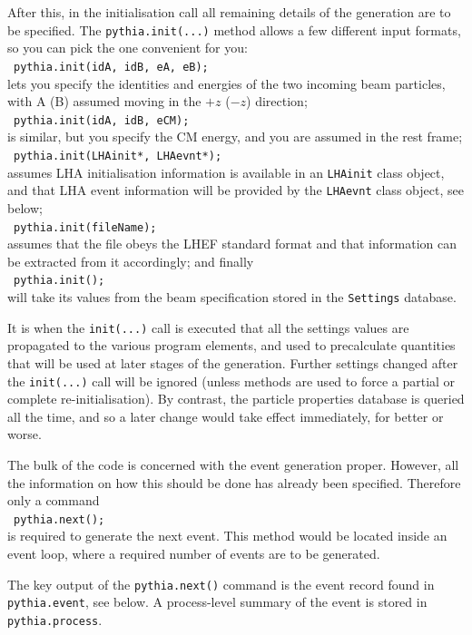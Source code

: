 \documentclass{elsartmod}
\newcommand{\cindent}{\hspace*{10mm}~}
\begin{document}
After this, in the initialisation call all remaining details of the 
generation are to be specified. The \texttt{pythia.init(...)} method 
allows a few different input formats, so you can pick the one 
convenient for you:\\
\cindent \texttt{pythia.init(idA, idB, eA, eB);}\\
lets you specify the identities and energies of the two incoming
beam particles, with A (B) assumed moving in the $+z$ ($-z$) 
direction;\\
\cindent \texttt{pythia.init(idA, idB, eCM);}\\
is similar, but you specify the CM energy, and you are assumed 
in the rest frame;\\
\cindent \texttt{pythia.init(LHAinit*, LHAevnt*);}\\ 
assumes LHA initialisation information is available 
in an \texttt{LHAinit} class object, and that LHA event information 
will be provided by the \texttt{LHAevnt} class object, see below;\\
\cindent \texttt{pythia.init(fileName);}\\ 
assumes that the file obeys the LHEF standard format and that 
information can be extracted from it accordingly;
and finally\\ 
\cindent \texttt{pythia.init();}\\
will take its values from the beam specification stored in the
\texttt{Settings} database.

It is when the \texttt{init(...)} call is executed that all the 
settings values are propagated to the various program elements, and 
used to precalculate quantities that will be used at later 
stages of the generation. Further settings changed after the 
\texttt{init(...)} call will be ignored (unless methods are used to force 
a partial or complete re-initialisation). By contrast, the particle
properties database is queried all the time, and so a later change
would take effect immediately, for better or worse. 

The bulk of the code is concerned with the event generation proper.
However, all the information on how this should be done has already
been specified. Therefore only a command\\
\cindent \texttt{pythia.next();}\\
is required to generate the next event. This method would be located
inside an event loop, where a required number of events are to be
generated. 

The key output of the \texttt{pythia.next()} command is the event
record found in \texttt{pythia.event}, see below. A process-level
summary of the event is stored in \texttt{pythia.process}. 
\end{document}

